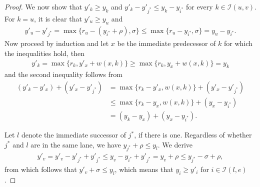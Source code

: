 \documentclass[a4paper]{article}
\theoremstyle{definition}
\theoremstyle{plain}
\begin{document}
\begin{proof}
  We now show that $y'_{k} \geq y_{k}$ and $y'_{k} - y'_{j^{*}} \leq y_{k} - y_{i^{*}}$ for every $k \in \mathcal{I}(u,v)$.
  For $k = u$, it is clear that $y'_{u} \geq y_{u}$ and
  \begin{align*}
    y'_{u} - y'_{j^{*}} = \max \{ r_{u} - (y_{i^{*}} + \rho), \sigma \} \leq \max \{ r_{u} - y_{i^{*}}, \sigma \} = y_{u} - y_{i^{*}}.
  \end{align*}
  Now proceed by induction and let $x$ be the immediate predecessor of $k$ for
  which the inequalities hold, then
  \begin{align*}
    y'_{k} = \max \{ r_{k}, y'_{x} + w(x,k) \} \geq \max \{ r_{k}, y_{x} + w(x,k) \} = y_{k}
  \end{align*}
  and the second inequality follows from
  \begin{align*}
    (y'_{k} - y'_{x}) + (y'_{x} - y'_{j^{*}}) &= \max \{ r_{k} - y'_{x}, w(x,k) \} + (y'_{x} - y'_{j^{*}}) \\
                                             &\leq \max \{ r_{k} - y_{x}, w(x,k) \} + (y_{x} - y_{i^{*}}) \\
                                             &= (y_{k} - y_{x}) + (y_{x} - y_{i^{*}}) .
  \end{align*}

  Let $l$ denote the immediate successor of $j^{*}$, if there is one. Regardless of
  whether $j^{*}$ and $l$ are in the same lane, we have
  $y_{j^{*}} + \rho \leq y_{l}$. We derive
  \begin{align*}
    y'_{v} = y'_{v} - y'_{j^{*}} + y'_{j^{*}} \leq y_{v} - y_{i^{*}} + y'_{j^{*}} = y_{v} + \rho \leq y_{j^{*}} - \sigma + \rho ,
  \end{align*}
  from which follows that $y'_{v} + \sigma \leq y_{l}$,
  which means that $y_{i} \geq y'_{i}$ for $i \in \mathcal{I}(l, e)$.


\end{proof}
\end{document}
